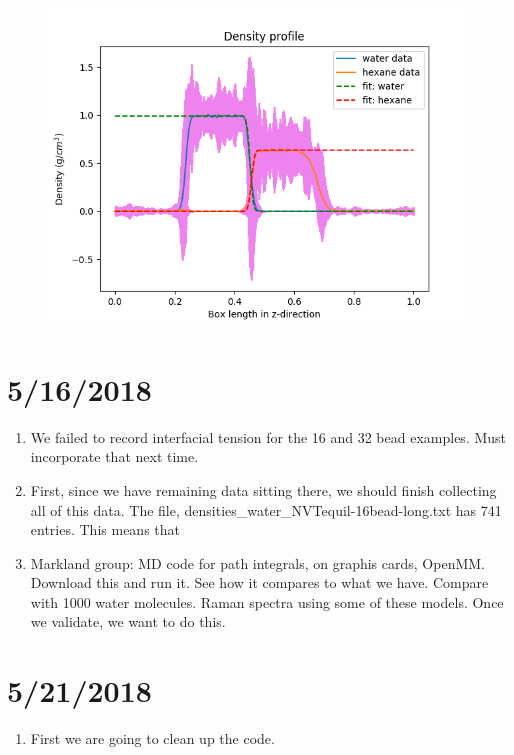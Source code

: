 \documentclass[12pt,reqno]{amsart}
\numberwithin{equation}{section}
\begin{document}
\begin{enumerate}
\begin{figure}[H]
\centering
\includegraphics[scale=0.6]{interface_density_profile_blockfit_NVTequil-32bead-long}
\end{figure}

\end{enumerate}

\section{5/16/2018}
\begin{enumerate}
\item We failed to record interfacial tension for the 16 and 32 bead examples.  Must incorporate that next time.  
\item First, since we have remaining data sitting there, we should finish collecting all of this data.  The file, densities\_water\_NVTequil-16bead-long.txt has 741 entries.  This means that 
\item Markland group: MD code for path integrals, on graphis cards, OpenMM.  Download this and run it.  See how it compares to what we have.  Compare with 1000 water molecules.  Raman spectra using some of these models.  Once we validate, we want to do this.  
\end{enumerate}

\section{5/21/2018}
\begin{enumerate}
\item First we are going to clean up the code.  
\end{enumerate}
\end{document}
